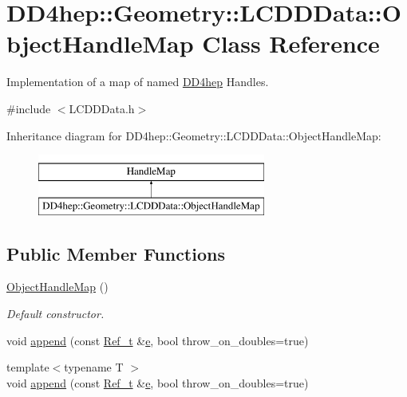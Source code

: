 \hypertarget{class_d_d4hep_1_1_geometry_1_1_l_c_d_d_data_1_1_object_handle_map}{}\section{D\+D4hep\+:\+:Geometry\+:\+:L\+C\+D\+D\+Data\+:\+:Object\+Handle\+Map Class Reference}
\label{class_d_d4hep_1_1_geometry_1_1_l_c_d_d_data_1_1_object_handle_map}


Implementation of a map of named \hyperlink{namespace_d_d4hep}{D\+D4hep} Handles.  




{\ttfamily \#include $<$L\+C\+D\+D\+Data.\+h$>$}

Inheritance diagram for D\+D4hep\+:\+:Geometry\+:\+:L\+C\+D\+D\+Data\+:\+:Object\+Handle\+Map\+:\begin{figure}[H]
\begin{center}
\leavevmode
\includegraphics[height=2.000000cm]{class_d_d4hep_1_1_geometry_1_1_l_c_d_d_data_1_1_object_handle_map}
\end{center}
\end{figure}
\subsection*{Public Member Functions}
\begin{DoxyCompactItemize}
\item 
\hyperlink{class_d_d4hep_1_1_geometry_1_1_l_c_d_d_data_1_1_object_handle_map_aacc5d9dd1f2e355617b5a215c66f924b}{Object\+Handle\+Map} ()
\begin{DoxyCompactList}\small\item\em Default constructor. \end{DoxyCompactList}\item 
void \hyperlink{class_d_d4hep_1_1_geometry_1_1_l_c_d_d_data_1_1_object_handle_map_a8881f90a02ef95a6a2e558f092e8f81a}{append} (const \hyperlink{group___d_d4_h_e_p___g_e_o_m_e_t_r_y_ga40af83be6718bb8828a3d83dc7f8c930}{Ref\+\_\+t} \&\hyperlink{_volumes_8cpp_a8a9a1f93e9b09afccaec215310e64142}{e}, bool throw\+\_\+on\+\_\+doubles=true)
\item 
{\footnotesize template$<$typename T $>$ }\\void \hyperlink{class_d_d4hep_1_1_geometry_1_1_l_c_d_d_data_1_1_object_handle_map_a11a8c4e48aa04381c284e803864a4947}{append} (const \hyperlink{group___d_d4_h_e_p___g_e_o_m_e_t_r_y_ga40af83be6718bb8828a3d83dc7f8c930}{Ref\+\_\+t} \&\hyperlink{_volumes_8cpp_a8a9a1f93e9b09afccaec215310e64142}{e}, bool throw\+\_\+on\+\_\+doubles=true)
\end{DoxyCompactItemize}



